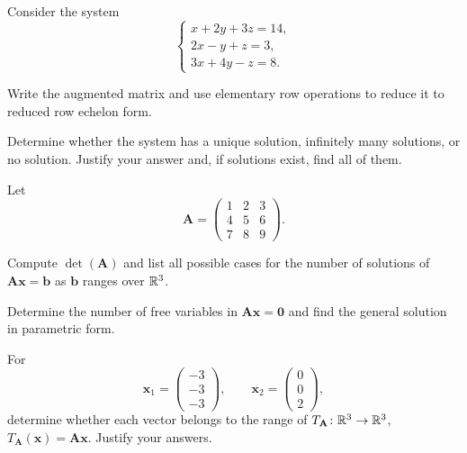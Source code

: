 \documentclass[11pt,oneside]{article}
\begin{document}
\begin{problem}
Consider the system
\[
\begin{cases}
x+2y+3z=14,\\
2x-y+z=3,\\
3x+4y-z=8.
\end{cases}
\]
\begin{problemsubparts}
\item Write the augmented matrix and use elementary row operations to reduce it to reduced row echelon form.
\item Determine whether the system has a unique solution, infinitely many solutions, or no solution. Justify your answer and, if solutions exist, find all of them.
\end{problemsubparts}
\end{problem}

\begin{problem}
Let
\[
\mathbf A=
\begin{pmatrix}
1&2&3\\
4&5&6\\
7&8&9
\end{pmatrix}.
\]
\begin{problemsubparts}
\item Compute $\det(\mathbf A)$ and list all possible cases for the number of solutions of $\mathbf A\mathbf x=\mathbf b$ as $\mathbf b$ ranges over $\mathbb{R}^3$.
\item Determine the number of free variables in $\mathbf A\mathbf x=\mathbf0$ and find the general solution in parametric form.
\item For
\[
\mathbf x_1=\begin{pmatrix}-3\\-3\\-3\end{pmatrix},
\qquad
\mathbf x_2=\begin{pmatrix}0\\0\\2\end{pmatrix},
\]
determine whether each vector belongs to the range of $T_{\mathbf A}\colon\mathbb{R}^3\to\mathbb{R}^3$, $T_{\mathbf A}(\mathbf x)=\mathbf A\mathbf x$. Justify your answers.
\end{problemsubparts}
\end{problem}
\end{document}
